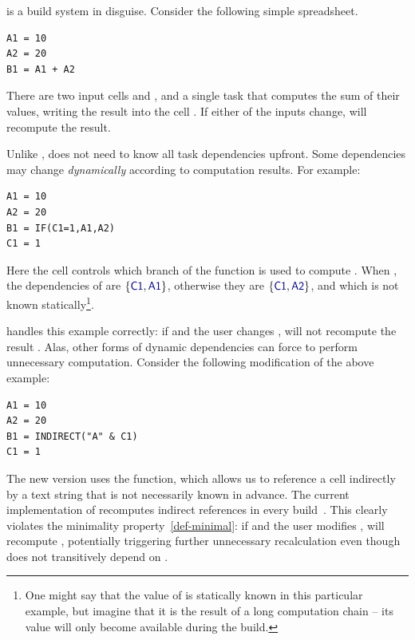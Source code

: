 \Excel is a build system in disguise. Consider the following simple spreadsheet.

\vspace{1mm}
\begin{verbatim}
A1 = 10
A2 = 20
B1 = A1 + A2
\end{verbatim}
\vspace{1mm}

\noindent
There are two input cells  and , and a single task that computes
the sum of their values, writing the result into the cell . If either of
the inputs change, \Excel will recompute the result.

Unlike \Make, \Excel does not need to know all task dependencies upfront. Some
dependencies may change \emph{dynamically} according to computation results. For
example:

\vspace{1mm}
\begin{verbatim}
A1 = 10
A2 = 20
B1 = IF(C1=1,A1,A2)
C1 = 1
\end{verbatim}
\vspace{1mm}

\noindent
Here the cell  controls which branch of the  function is used
to compute . When , the dependencies of  are
$\{\cmd{C1},\cmd{A1}\}$, otherwise they are $\{\cmd{C1},\cmd{A2}\}$, and which is
not known statically\footnote{One might say that the value of  is statically
known in this particular example, but imagine that it is the result of a long computation
chain -- its value will only become available during the build.}.

\Excel handles this example correctly: if  and the user changes
, \Excel will not recompute the result . Alas, other forms of
dynamic dependencies can force \Excel to perform unnecessary computation.
Consider the following modification of the above example:

\vspace{1mm}
\begin{verbatim}
A1 = 10
A2 = 20
B1 = INDIRECT("A" & C1)
C1 = 1
\end{verbatim}
\vspace{1mm}

\noindent
The new version uses the  function, which allows us to reference a
cell indirectly by a text string that is not necessarily known in advance. The
current implementation of \Excel recomputes indirect references in every
build~\cite{excel_recalc}. This clearly violates the minimality
property~\ref{def-minimal}: if  and the user modifies , \Excel
will recompute , potentially triggering further unnecessary
recalculation even though  does not transitively depend on .

